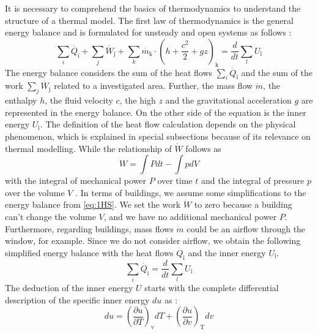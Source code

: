     It is necessary to comprehend the basics of thermodynamics to understand the structure of a thermal model. The first law of thermodynamics is the general energy balance and is formulated for unsteady and open systems as follows \cite{Baehr.2016b}:
    \begin{equation}
        \label{eq:1HS}
        \sum_i \dot{Q_\text{i}} + \sum_j \dot{W_\text{j}} + \sum_k \dot{m_\text{k}}\cdot (h + \frac{c^2}{2} + gz)_\text{k} = \frac{d}{dt} \sum_l U_\text{l}
    \end{equation}
    The energy balance considers the sum of the heat flows $\sum_i \dot{Q_\text{i}}$ and the sum of the work $\sum_j \dot{W_\text{j}}$ related to a investigated area. Further, the mass flow $\dot{m}$, the enthalpy $h$, the fluid velocity $c$, the high $z$ and the gravitational acceleration $g$ are represented in the energy balance. On the other side of the equation is the inner energy $U_\text{l}$. \newline
    The definition of the heat flow calculation depends on the physical phenomenon, which is explained in special subsections because of its relevance on thermal modelling. While the relationship of $\dot{W}$ follows as  
    \begin{equation}
        \label{eq:workinEnergyBalance}
        W =\int Pdt - \int pdV
    \end{equation}
    with the integral of mechanical power $P$ over time $t$ and the integral of pressure $p$ over the volume $V$ \cite{Baehr.2016b}.\newline
    In terms of buildings, we assume some simplifications to the energy balance from \autoref{eq:1HS}.
    We set the work $\dot{W}$ to zero because a building can't change the volume $V$, and we have no additional mechanical power $P$. Furthermore, regarding buildings, mass flows $\dot{m}$ could be an airflow through the window, for example. Since we do not consider airflow, we obtain the following simplified energy balance with the heat flows $\dot{Q_\text{i}}$ and the inner energy $U_\text{l}$.
     \begin{equation}
        \label{eq:1HSkurz}
        \sum_i \dot{Q_\text{i}}  = \frac{d}{dt} \sum_l U_\text{l}
    \end{equation}
    The deduction of the inner energy $U$  starts with the complete differential description of the specific inner energy $du$ as \cite{Cerbe.2021}:
    \begin {equation} 
    \label{eq:spezificinnerEnergy}
    du = (\frac{\partial u}{\partial T})_\text{v} dT + (\frac{\partial u}{\partial v})_\text{T} dv
    \end{equation}
